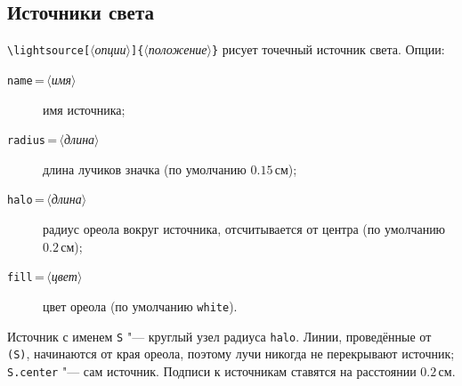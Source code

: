 \documentclass[a4paper,11pt]{article}
\newcommand\cs[1]{\texttt{\textbackslash#1}}
\newcommand\key[1]{\texttt{#1}}
\newcommand\marg[1]{\texttt{\{}\meta{#1}\texttt{\}}}
\newcommand\oarg[1]{\texttt{[}\meta{#1}\texttt{]}}
\newcommand\meta[1]{\ensuremath{\langle}\textit{#1}\ensuremath{\rangle}}
\newcommand\showanchor[3][right]{%
  \fill[red] #2 circle[radius=0.8pt]
    node[#1, font=\scriptsize\ttfamily, text=red!70!black, inner sep=1.5pt] {#3};}
\newcommand\showanchorat[4][right]{%
  \draw[red, ultra thin] #2 -- #3;
  \showanchor[#1]{#2}{}\path #3 node[#1, font=\scriptsize\ttfamily,
    text=red!70!black, inner sep=1.5pt] {#4};}
\newenvironment{anchors}
  {\begin{tcolorbox}[colback=white, colframe=black!30, boxrule=0.4pt, arc=1mm,
     halign=center, title={\small anchors}, coltitle=black, colbacktitle=black!8]}
  {\end{tcolorbox}}
\begin{document}
\subsection{Источники света}
\cs{lightsource}\oarg{опции}\marg{положение} рисует точечный источник света.
Опции:
\begin{description}
  \item[\key{name}\,=\,\meta{имя}] имя источника;
  \item[\key{radius}\,=\,\meta{длина}] длина лучиков значка (по умолчанию
    \(0.15\,\text{см}\));
  \item[\key{halo}\,=\,\meta{длина}] радиус ореола вокруг источника,
    отсчитывается от центра (по умолчанию \(0.2\,\text{см}\));
  \item[\key{fill}\,=\,\meta{цвет}] цвет ореола (по умолчанию
    \texttt{white}).
\end{description}
Источник с именем \texttt{S} "--- круглый узел радиуса \key{halo}. Линии,
проведённые от \texttt{(S)}, начинаются от края ореола, поэтому лучи никогда
не перекрывают источник; \texttt{S.center} "--- сам источник. Подписи к
источникам ставятся на расстоянии \(0.2\,\text{см}\).
\begin{example}
\end{example}
\begin{anchors}
\end{anchors}
\end{document}
